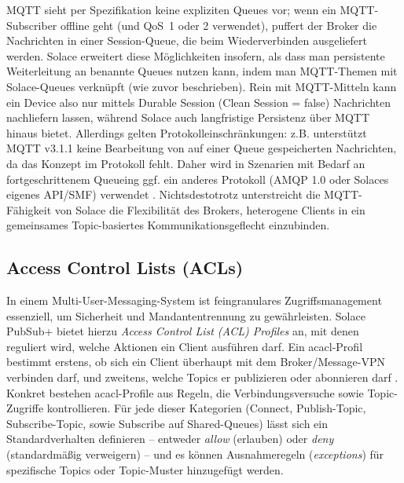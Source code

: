 MQTT sieht per Spezifikation keine expliziten Queues vor; wenn ein MQTT-Subscriber offline geht (und QoS 1 oder 2 verwendet), puffert der Broker die Nachrichten in einer Session-Queue, die beim Wiederverbinden ausgeliefert werden. Solace erweitert diese Möglichkeiten insofern, als dass man persistente Weiterleitung an benannte Queues nutzen kann, indem man MQTT-Themen mit Solace-Queues verknüpft (wie zuvor beschrieben). Rein mit MQTT-Mitteln kann ein Device also nur mittels Durable Session (Clean Session = false) Nachrichten nachliefern lassen, während Solace auch langfristige Persistenz über MQTT hinaus bietet. Allerdings gelten Protokolleinschränkungen: z.B. unterstützt MQTT v3.1.1 keine Bearbeitung von auf einer Queue gespeicherten Nachrichten, da das Konzept im Protokoll fehlt. Daher wird in Szenarien mit Bedarf an fortgeschrittenem Queueing ggf. ein anderes Protokoll (AMQP 1.0 oder Solaces eigenes API/SMF) verwendet \cite{SolaceDaprMQTT}. Nichtsdestotrotz unterstreicht die MQTT-Fähigkeit von Solace die Flexibilität des Brokers, heterogene Clients in ein gemeinsames Topic-basiertes Kommunikationsgeflecht einzubinden.

\subsection{Access Control Lists (ACLs)}

In einem Multi-User-Messaging-System ist feingranulares Zugriffsmanagement essenziell, um Sicherheit und Mandantentrennung zu gewährleisten. Solace PubSub+ bietet hierzu \textit{Access Control List (ACL) Profiles} an, mit denen reguliert wird, welche Aktionen ein Client ausführen darf. Ein ac{acl}-Profil bestimmt erstens, ob sich ein Client überhaupt mit dem Broker/Message-VPN verbinden darf, und zweitens, welche Topics er publizieren oder abonnieren darf \cite{SolaceACL}. Konkret bestehen ac{acl}-Profile aus Regeln, die Verbindungsversuche sowie Topic-Zugriffe kontrollieren. Für jede dieser Kategorien (Connect, Publish-Topic, Subscribe-Topic, sowie Subscribe auf Shared-Queues) lässt sich ein Standardverhalten definieren – entweder \textit{allow} (erlauben) oder \textit{deny} (standardmäßig verweigern) – und es können Ausnahmeregeln (\textit{exceptions}) für spezifische Topics oder Topic-Muster hinzugefügt werden.

